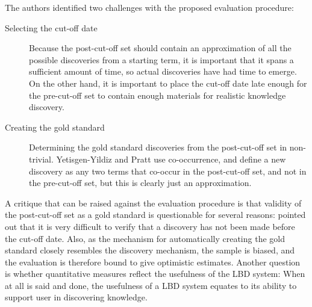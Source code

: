 The authors identified two challenges with the proposed evaluation procedure: 
\begin{description}
\item[Selecting the cut-off date] Because the post-cut-off set should contain an approximation of all the possible discoveries from a starting term, it is important that it spans a sufficient amount of time, so actual discoveries have had time to emerge. On the other hand, it is important to place the cut-off date late enough for the pre-cut-off set to contain enough materials for realistic knowledge discovery.
\item[Creating the gold standard] Determining the gold standard discoveries from the post-cut-off set in non-trivial. Yetisgen-Yildiz and Pratt use co-occurrence, and define a new discovery as any two terms that co-occur in the post-cut-off set, and not in the pre-cut-off set, but this is clearly just an approximation.
\end{description}

A critique that can be raised against the evaluation procedure is that validity of the post-cut-off set as a gold standard is questionable for several reasons: \citet{kos07} pointed out that it is very difficult to verify that a discovery has not been made before the cut-off date. Also, as the mechanism for automatically creating the gold standard closely resembles the discovery mechanism, the sample is biased, and the evaluation is therefore bound to give optimistic estimates. Another question is whether quantitative measures reflect the usefulness of the LBD system: When at all is said and done, the usefulness of a LBD system equates to its ability to support user in discovering knowledge.



